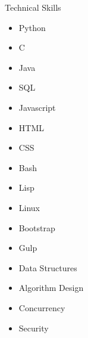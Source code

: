 \documentclass{resume} %
\begin{document}
\begin{rSection}{Technical Skills}

\begin{minipage}[t]{4cm}
    \begin{itemize}
        \item Python
        \item C 
        \item Java
        \item SQL
    \end{itemize}
\end{minipage}
\begin{minipage}[t]{4cm}
    \begin{itemize}
        \item Javascript
        \item HTML
        \item CSS
        \item Bash
    \end{itemize}
\end{minipage}
\begin{minipage}[t]{4cm}
    \begin{itemize}
        \item Lisp        
        \item Linux        
        \item Bootstrap
        \item Gulp
    \end{itemize}
\end{minipage}
\begin{minipage}[t]{4cm}
    \begin{itemize}
    		\item Data Structures
        \item Algorithm Design
        \item Concurrency
        \item Security
    \end{itemize}
\end{minipage}

\end{rSection}

\end{document}

